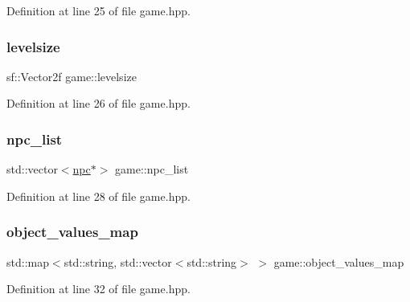 Definition at line 25 of file game.\+hpp.

\mbox{\label{classgame_abccd2ff11b53d33fde0ee8ab50c29972}} 
\subsubsection{\texorpdfstring{levelsize}{levelsize}}
{\footnotesize\ttfamily sf\+::\+Vector2f game\+::levelsize\hspace{0.3cm}{\ttfamily [private]}}



Definition at line 26 of file game.\+hpp.

\mbox{\label{classgame_af427a7b929715c637cb10a4894386ead}} 
\subsubsection{\texorpdfstring{npc\+\_\+list}{npc\_list}}
{\footnotesize\ttfamily std\+::vector$<$\hyperlink{classnpc}{npc}$\ast$$>$ game\+::npc\+\_\+list\hspace{0.3cm}{\ttfamily [private]}}



Definition at line 28 of file game.\+hpp.

\mbox{\label{classgame_a7fcd329ec94a2aa84d486e67978d417a}} 
\subsubsection{\texorpdfstring{object\+\_\+values\+\_\+map}{object\_values\_map}}
{\footnotesize\ttfamily std\+::map$<$std\+::string, std\+::vector$<$std\+::string$>$ $>$ game\+::object\+\_\+values\+\_\+map\hspace{0.3cm}{\ttfamily [private]}}



Definition at line 32 of file game.\+hpp.

\mbox{\label{classgame_af7435cad08a8114c7598bc99f5b6496e}} 
